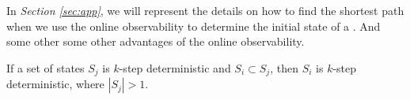 In {\em Section \ref{sec:app}}, we will represent the details on how to find the shortest path when we use the online observability to determine the initial state of a \BCN. And some other some other advantages of the online observability.





\begin{lemma}
 If a set of states $S_j$ is $k$-step deterministic and $S_i\subset S_j$, then $S_i$ is $k$-step deterministic, where $|S_j|>1$.
  \label{lemm:4}
\end{lemma}
